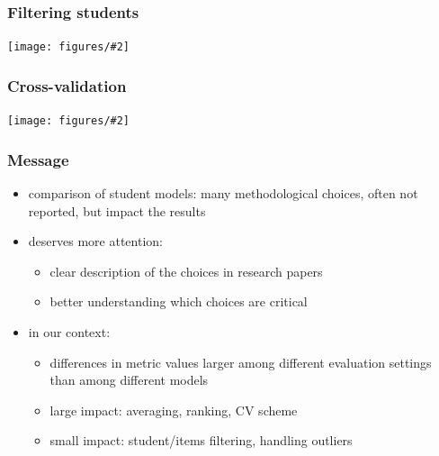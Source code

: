 \documentclass[bigger]{beamer}
\newcommand{\img}[2]{
  \begin{center}
    \texttt{[image: figures/\#2]}
  \end{center}
}
\begin{document}
\begin{frame}
  \frametitle{Filtering students}
  \img{1.0}{students-min-attempts--Robot}

\end{frame}

\begin{frame}
  \frametitle{Cross-validation}
  \img{1.0}{cv--turtle}

\end{frame}


\begin{frame}
  \frametitle{Message}


  \begin{itemize}
  \item comparison of student models: many methodological choices, often not
        reported, but impact the results
  \item deserves more attention:
    \begin{itemize}
    \item clear description of the choices in research papers
    \item better understanding which choices are critical
    \end{itemize}
  \item in our context:
    \begin{itemize}
    \item differences in metric values larger among different evaluation settings
          than among different models
    \item large impact: averaging, ranking, CV scheme
    \item small impact: student/items filtering, handling outliers
    \end{itemize}
  \end{itemize}

\end{frame}
\end{document}
